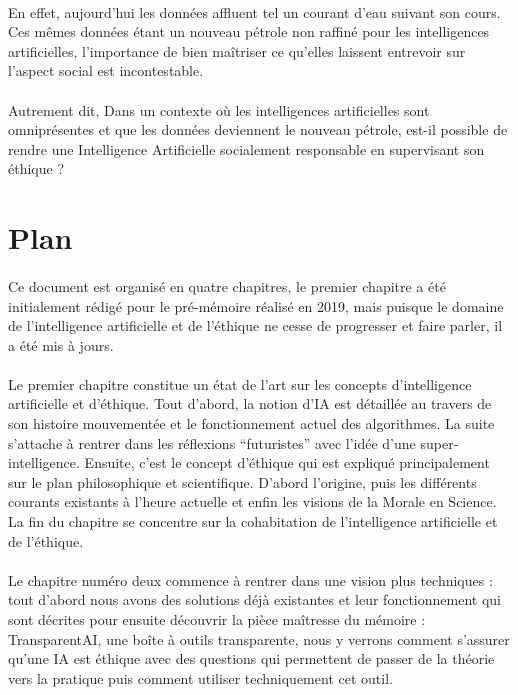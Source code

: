 \documentclass[10pt, french, a4paper]{report}
\begin{document}
\paragraph{}
En effet, aujourd’hui les données affluent tel un courant d’eau suivant son cours. Ces mêmes données étant un nouveau pétrole non raffiné pour les intelligences artificielles, l’importance de bien maîtriser ce qu’elles laissent entrevoir sur l’aspect social est incontestable.

\paragraph{}
Autrement dit, Dans un contexte où les intelligences artificielles sont omniprésentes et que les données deviennent le nouveau pétrole, est-il possible de rendre une Intelligence Artificielle socialement responsable en supervisant son éthique ?


\section*{Plan} 

\paragraph{}
Ce document est organisé en quatre chapitres, le premier chapitre a été initialement rédigé pour le pré-mémoire réalisé en 2019, mais puisque le domaine de l'intelligence artificielle et de l'éthique ne cesse de progresser et faire parler, il a été mis à jours.

\paragraph{}
Le premier chapitre constitue un état de l’art sur les concepts d’intelligence artificielle et d’éthique. Tout d’abord, la notion d’IA est détaillée au travers de son histoire mouvementée et le fonctionnement actuel des algorithmes. La suite s’attache à rentrer dans les réflexions ``futuristes'' avec l’idée d’une super-intelligence. Ensuite, c’est le concept d’éthique qui est expliqué principalement sur le plan philosophique et scientifique. D’abord l’origine, puis les différents courants existants à l’heure actuelle et enfin les visions de la Morale en Science. La fin du chapitre se concentre sur la cohabitation de l'intelligence artificielle et de l'éthique.

\paragraph{}
Le chapitre numéro deux commence à rentrer dans une vision plus techniques : tout d'abord nous avons des solutions déjà existantes et leur fonctionnement qui sont décrites pour ensuite découvrir la pièce maîtresse du mémoire : TransparentAI, une boîte à outils transparente, nous y verrons comment s'assurer qu'une IA est éthique avec des questions qui permettent de passer de la théorie vers la pratique puis comment utiliser techniquement cet outil.
\end{document}
